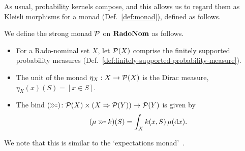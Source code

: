   As usual, probability kernels compose, and this allows us to regard
  them as Kleisli morphisms for a monad (Def.~\ref{def:monad}), defined as follows.
\begin{definition}\label{def:monad-radonom}
  We define the strong monad $\mathcal{P}$ on $\mathbf{RadoNom}$ as follows.
  \begin{itemize}
  \item For a Rado-nominal set $X$, let $\mathcal{P} (X)$ comprise the
    finitely supported probability measures (Def.~\ref{def:finitely-supported-probability-measure}).
  \item
    The unit of the monad $\eta_X:X\to \mathcal{P} (X)$ is the Dirac measure,
    $\eta_X(x)(S)=[x\in S]$.
  \item
    The bind $(\bind) \colon \MonadP (X)\times (X\Rightarrow \MonadP (Y))\to \MonadP (Y)$ is given
    by
    \[
      (\mu \bind k)(S)=\int_X k(x,S)\,\mu(\dd x).
    \]
  \end{itemize}
\end{definition}
We note that this is similar to the `expectations monad'~\cite[Thm.~4]{EPTCS95.12}. 
